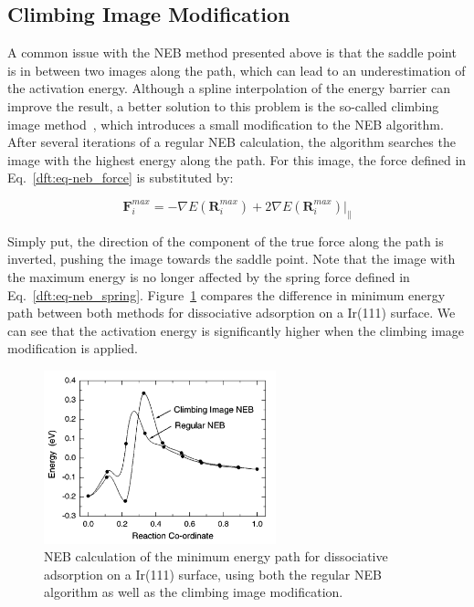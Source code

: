 \begin{refsection}
\subsection{Climbing Image Modification}

A common issue with the NEB method presented above is that the saddle point is 
in between two images along the path, which can lead to an underestimation of 
the activation energy. Although a spline interpolation of the energy barrier 
can improve the result, a better solution to this problem is the so-called 
climbing image method~\cite{Henkelman2000a}, which introduces a small 
modification to the NEB algorithm. After several iterations of a regular NEB 
calculation, the algorithm searches the image with the highest energy along 
the path. For this image, the force defined in Eq.~\ref{dft:eq-neb_force} is 
substituted by: 

\begin{equation}
\mathbf{F}_i^{max} = -\nabla E(\mathbf{R}_i^{max}) + 2\nabla 
E(\mathbf{R}_i^{max})|_\parallel 
\end{equation}

Simply put, the direction of the component of the true force along the path is 
inverted, pushing the image towards the saddle point. Note that the image with 
the maximum energy is no longer affected by the spring force defined in 
Eq.~\ref{dft:eq-neb_spring}. Figure~\ref{dft:fig-neb_climbing} compares the difference 
in minimum energy path between both methods for  dissociative 
adsorption on a Ir(111) surface. We can see that the activation energy is 
significantly higher when the climbing image modification is applied. 
 
\begin{figure}[ht] 
\centering 
\includegraphics[width=0.6\textwidth]{./figures/DFT/ci-neb.png} 
\caption{\label{dft:fig-neb_climbing}NEB calculation of the minimum energy path 
for  dissociative adsorption on a Ir(111) surface, using both the 
regular NEB algorithm as well as the climbing image 
modification.~\cite{Henkelman2000a}} 
\end{figure} 
 
\printbibliography 
\end{refsection} 
